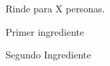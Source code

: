 
Rinde para X personas.

\begin{ingredientes}
\item Primer ingrediente
\item Segundo Ingrediente
\end{ingredientes}
\preparacion

